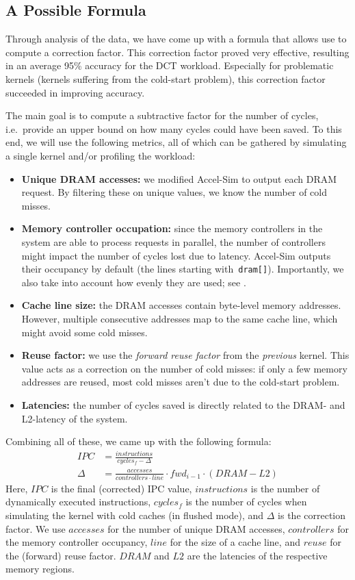 \subsection{A Possible Formula}\label{subsec:formula}
Through analysis of the data, we have come up with a formula that allows use to compute a correction factor.
This correction factor proved very effective, resulting in an average 95\% accuracy for the DCT workload.
Especially for problematic kernels (kernels suffering from the cold-start problem), this correction factor succeeded in improving accuracy.

The main goal is to compute a subtractive factor for the number of cycles, i.e.\ provide an upper bound on how many cycles could have been saved.
To this end, we will use the following metrics, all of which can be gathered by simulating a single kernel and/or profiling the workload:
\begin{itemize}
    \item \textbf{Unique DRAM accesses:} we modified Accel-Sim to output each DRAM request.
    By filtering these on unique values, we know the number of cold misses.
    \item \textbf{Memory controller occupation:} since the memory controllers in the system are able to process requests in parallel, the number of controllers might impact the number of cycles lost due to latency.
    Accel-Sim outputs their occupancy by default (the lines starting with\ \verb|dram[]|).
    Importantly, we also take into account how evenly they are used; see .
    \item \textbf{Cache line size:} the DRAM accesses contain byte-level memory addresses.
    However, multiple consecutive addresses map to the same cache line, which might avoid some cold misses.
    \item \textbf{Reuse factor:} we use the \textit{forward reuse factor} from the \emph{previous} kernel.
    This value acts as a correction on the number of cold misses: if only a few memory addresses are reused, most cold misses aren't due to the cold-start problem.
    \item \textbf{Latencies:} the number of cycles saved is directly related to the DRAM- and L2-latency of the system.
\end{itemize}

Combining all of these, we came up with the following formula:
\begin{align}
    IPC &= \frac{instructions}{cycles_f - \Delta} \\
    \Delta &= \frac{accesses}{controllers \cdot line} \cdot fwd_{i-1} \cdot (DRAM - L2)
\end{align}
Here, $IPC$ is the final (corrected) IPC value, $instructions$ is the number of dynamically executed instructions, $cycles_f$ is the number of cycles when simulating the kernel with cold caches (in flushed mode), and $\Delta$ is the correction factor.
We use $accesses$ for the number of unique DRAM accesses, $controllers$ for the memory controller occupancy, $line$ for the size of a cache line, and $reuse$ for the (forward) reuse factor.
$DRAM$ and $L2$ are the latencies of the respective memory regions.

